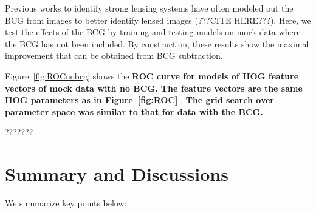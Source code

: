 \documentclass{emulateapj}
\newcommand{\todo}[1]{{\bf\color{blue} #1}}
\begin{document}
Previous works to identify strong lensing systems have often modeled
out the BCG from images to better identify lensed images (???CITE
HERE???).  Here, we test the effects of the BCG by training and
testing models on mock data where the BCG has not been included.  By
construction, these results show the maximal improvement that can be
obtained from BCG subtraction.

Figure~\ref{fig:ROCnobcg} shows the \todo{ROC curve for models of HOG
  feature vectors of mock data with no BCG.  The feature vectors are
  the same HOG parameters as in Figure~\ref{fig:ROC} }.  \todo{The
  grid search over parameter space was similar to that for data with
  the BCG.}

???????

\section{Summary and Discussions}
\label{sec:conclusions}

We summarize key points below:
\end{document}
